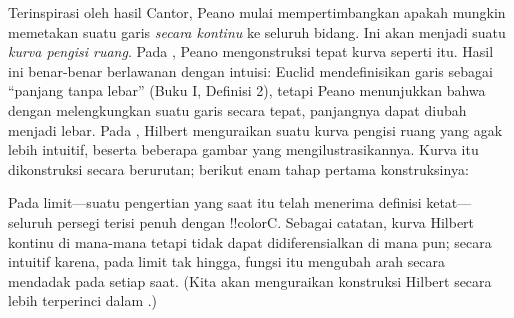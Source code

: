 \documentclass[../../../include/open-logic-section]{subfiles}
\begin{document}
Terinspirasi oleh hasil Cantor, Peano mulai mempertimbangkan apakah mungkin
memetakan suatu garis \emph{secara kontinu} ke seluruh bidang. Ini akan
menjadi suatu \emph{kurva pengisi ruang}. Pada \citeyear{Peano1890}, Peano
mengonstruksi tepat kurva seperti itu. Hasil ini benar-benar berlawanan
dengan intuisi: Euclid mendefinisikan garis sebagai ``panjang tanpa
lebar'' (Buku I, Definisi 2), tetapi Peano menunjukkan bahwa dengan
melengkungkan suatu garis secara tepat, panjangnya dapat diubah menjadi
lebar. Pada \citeyear{Hilbert1891}, Hilbert menguraikan suatu kurva pengisi
ruang yang agak lebih intuitif, beserta beberapa gambar yang
mengilustrasikannya. Kurva itu dikonstruksi secara berurutan; berikut enam
tahap pertama konstruksinya:
\begin{center}
\end{center}
Pada limit---suatu pengertian yang saat itu telah menerima definisi
ketat---seluruh persegi terisi penuh dengan !!{colorC}. Sebagai catatan,
kurva Hilbert kontinu di mana-mana tetapi tidak dapat didiferensialkan di
mana pun; secara intuitif karena, pada limit tak hingga, fungsi itu mengubah
arah secara mendadak pada setiap saat. (Kita akan menguraikan konstruksi
Hilbert secara lebih terperinci dalam
.)
\end{document}
